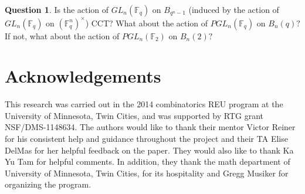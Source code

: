 \documentclass[10 pt]{amsart}
\theoremstyle{plain}
\theoremstyle{definition}
\newtheorem{question}[thm]{Question}
\theoremstyle{remark}
\numberwithin{equation}{section}
\newcommand\BF{{\mathbb F}}
\begin{document}
\begin{question}
Is the action of $GL_n(\BF_q)$ on $B_{q^n-1}$ (induced by the action of $GL_n(\BF_q)$ on $(\BF_q^n)^\times$) CCT? What about the action of $PGL_n(\BF_q)$ on $B_n(q)?$ If not, what about the action of $PGL_n(\BF_2)$ on $B_n(2)?$ 
\end{question}

\section*{Acknowledgements}
This research was carried out in the 2014 combinatorics REU program at the University of Minnesota, Twin Cities, and was supported by RTG grant NSF/DMS-1148634.
The authors would like to thank their mentor Victor Reiner for his consistent help and guidance throughout the project and their TA Elise DelMas for her helpful feedback on the paper. They would also like to thank Ka Yu Tam for helpful comments.  In addition, they thank the math department of University of Minnesota, Twin Cities, for its hospitality and Gregg Musiker for organizing the program.



\end{document}
